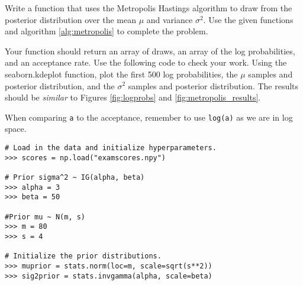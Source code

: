 \begin{comment}
\begin{figure}[h]
\centering
\texttt{[image: figures/logprobs.pdf]}
\caption{Log probabilities of our samples.}
\end{figure}

From this we can see that after between $300$ and $500$ iterations, we had converged to the correct distribution. We can visualize the path of our sampler by plotting the samples themselves:
\begin{figure}[h]
\centering
\texttt{[image: figures/samples.pdf]}
\caption{Samples from the Metropolis algorithm.}
\end{figure}

\begin{problem}
Using $\mu$ and $\Sigma$ as defined previously and using an initial state $\mathbf{x} = \left[ \begin{array}{cc} 1000 & -1000 \end{array} \right]$ run your Metropolis sampler for $10000$ iterations. Plot the log probs as well as the samples. How long did it take to converge?
\end{problem}
\end{comment}

\begin{problem}
Write a function that uses the Metropolis Hastings algorithm to draw from the posterior distribution over the mean $\mu$ and variance $\sigma^2$. Use the given functions and algorithm \ref{alg:metropolis} to complete the problem.

	Your function should return an array of draws, an array of the log probabilities, and an acceptance rate. Use the following code to check your work. Using the seaborn.kdeplot function, plot the first 500 log probabilities, the $\mu$ samples and posterior distribution, and the $\sigma^2$ samples and posterior distribution. The results should be \textit{similar} to Figures \ref{fig:logprobs} and \ref{fig:metropolis_results}.

When comparing \texttt{a} to the acceptance, remember to use \texttt{log(a)} as we are in log space.


\begin{lstlisting}
# Load in the data and initialize hyperparameters.
>>> scores = np.load("examscores.npy")

# Prior sigma^2 ~ IG(alpha, beta)
>>> alpha = 3
>>> beta = 50

#Prior mu ~ N(m, s)
>>> m = 80
>>> s = 4

# Initialize the prior distributions.
>>> muprior = stats.norm(loc=m, scale=sqrt(s**2))
>>> sig2prior = stats.invgamma(alpha, scale=beta)
\end{lstlisting}

\end{problem}

